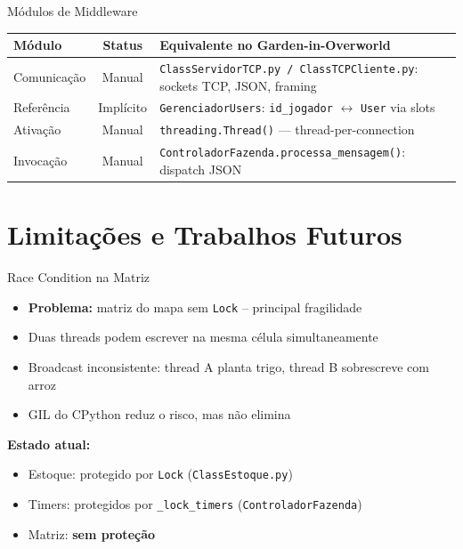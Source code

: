 \documentclass[aspectratio=169]{beamer}
\begin{document}
\begin{frame}{M\'odulos de Middleware}
  \footnotesize
  \begin{tabular}{>{\raggedright\arraybackslash}p{2.5cm}c>{\raggedright\arraybackslash}p{8.5cm}}
    \toprule
    \textbf{M\'odulo} & \textbf{Status} & \textbf{Equivalente no Garden-in-Overworld} \\
    \midrule
    Comunica\c{c}\~ao & Manual & \texttt{ClassServidorTCP.py / ClassTCPCliente.py}: sockets TCP, JSON, framing \\
    Refer\^encia & Impl\'icito & \texttt{GerenciadorUsers}: \texttt{id\_jogador} $\leftrightarrow$ \texttt{User} via slots \\
    Ativa\c{c}\~ao & Manual & \texttt{threading.Thread()} --- thread-per-connection \\
    Invoca\c{c}\~ao & Manual & \texttt{ControladorFazenda.processa\_mensagem()}: dispatch JSON \\
    \bottomrule
  \end{tabular}
\end{frame}

\section{Limita\c{c}\~oes e Trabalhos Futuros}

\begin{frame}{Race Condition na Matriz}
  \begin{itemize}
    \item \textbf{Problema:} matriz do mapa sem \texttt{Lock} -- principal fragilidade
    \item Duas threads podem escrever na mesma c\'elula simultaneamente
    \item Broadcast inconsistente: thread A planta trigo, thread B sobrescreve com arroz
    \item GIL do CPython reduz o risco, mas n\~ao elimina
  \end{itemize}
  \vfill
  \textbf{Estado atual:}
  \begin{itemize}
    \item Estoque: protegido por \texttt{Lock} (\texttt{ClassEstoque.py})
    \item Timers: protegidos por \texttt{\_lock\_timers} (\texttt{ControladorFazenda})
    \item Matriz: \textbf{sem prote\c{c}\~ao}
  \end{itemize}
\end{frame}
\end{document}
